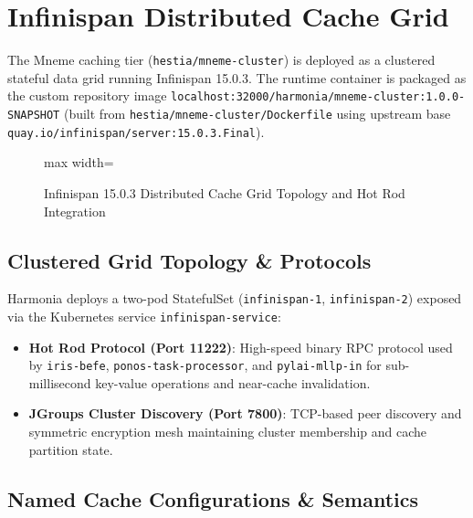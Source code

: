 
\chapter{Infinispan Distributed Cache Grid}
\label{chap:infinispan_grid}

The Mneme caching tier (\texttt{hestia/mneme-cluster}) is deployed as a clustered stateful data grid running Infinispan 15.0.3. The runtime container is packaged as the custom repository image \nolinkurl{localhost:32000/harmonia/mneme-cluster:1.0.0-SNAPSHOT} (built from \nolinkurl{hestia/mneme-cluster/Dockerfile} using upstream base \nolinkurl{quay.io/infinispan/server:15.0.3.Final}).

\begin{figure}[htbp]
    \centering
    \begin{adjustbox}{max width=\textwidth}
        
    \end{adjustbox}
    \caption{Infinispan 15.0.3 Distributed Cache Grid Topology and Hot Rod Integration}
    \label{fig:mneme_cache_grid}
\end{figure}

\section{Clustered Grid Topology \& Protocols}

Harmonia deploys a two-pod StatefulSet (\texttt{infinispan-1}, \texttt{infinispan-2}) exposed via the Kubernetes service \texttt{infinispan-service}:
\begin{itemize}
    \item \textbf{Hot Rod Protocol (Port 11222)}: High-speed binary RPC protocol used by \texttt{iris-befe}, \nolinkurl{ponos-task-processor}, and \texttt{pylai-mllp-in} for sub-millisecond key-value operations and near-cache invalidation.
    \item \textbf{JGroups Cluster Discovery (Port 7800)}: TCP-based peer discovery and symmetric encryption mesh maintaining cluster membership and cache partition state.
\end{itemize}

\section{Named Cache Configurations \& Semantics}

